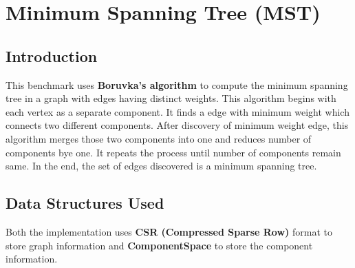 \documentclass{article}
\begin{document}


\section{Minimum Spanning Tree (MST)}

\subsection{Introduction}

This benchmark uses \textbf{Boruvka's algorithm} to compute the minimum spanning tree in a graph with edges having distinct weights. This algorithm begins with each vertex as a separate component. It finds a edge with minimum weight which connects two different components. After discovery of minimum weight edge, this algorithm merges those two components into one and reduces number of components bye one. It repeats the process until number of components remain same. In the end, the set of edges discovered is a minimum spanning tree.  

\subsection{Data Structures Used}
Both the implementation uses \textbf{CSR (Compressed Sparse Row)} format to store graph information and \textbf{ComponentSpace} to store the component information.
\end{document}
